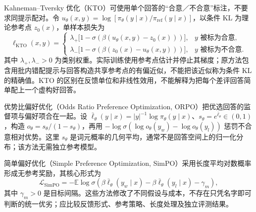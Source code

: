 Kahneman--Tversky 优化（KTO）可使用单个回答的“合意／不合意”标注，不要求同提示配对。令 $u_\theta(x,y)=\log[\pi_\theta(y\mid x)/\pi_{\mathrm{ref}}(y\mid x)]$，以条件 KL 为理论参考点 $z_0(x)$，单样本损失为
\[
\ell_{\mathrm{KTO}}(x,y)=
\begin{cases}
\lambda_+\bigl[1-\sigma(\beta(u_\theta(x,y)-z_0(x)))\bigr],&y\text{ 被标为合意},\\
\lambda_-\bigl[1-\sigma(\beta(z_0(x)-u_\theta(x,y)))\bigr],&y\text{ 被标为不合意}.
\end{cases}
\]
其中 $\lambda_+,\lambda_->0$ 为类别权重。实际训练使用参考点估计并停止其梯度；原方法包含用批内错配提示与回答构造共享参考点的有偏近似，不能把该近似称为条件 KL 的精确值。KTO 的区别在反馈单位和非线性效用，不能解释为把每个差评回答简单配上一个虚构好回答\cite{kto}。

优势比偏好优化（Odds Ratio Preference Optimization, ORPO）把优选回答的监督项与偏好项合在一起。设 $\bar\ell_\theta(y\mid x)=|y|^{-1}\log\pi_\theta(y\mid x)$、$s_\theta=e^{\bar\ell_\theta}\in(0,1)$，构造 $o_\theta=s_\theta/(1-s_\theta)$，再用 $-\log\sigma(\log o_\theta(y_w)-\log o_\theta(y_l))$ 惩罚不合意相对优势。这里 $s_\theta$ 是词元概率的几何平均，通常不是回答空间上的归一化分布；该方法无需独立参考模型\cite{orpo}。

简单偏好优化（Simple Preference Optimization, SimPO）采用长度平均对数概率形成无参考奖励，其核心形式为
\[
\mathcal L_{\mathrm{SimPO}}=-\mathbb E\log\sigma\!\left(
\beta\bar\ell_\theta(y_w\mid x)-\beta\bar\ell_\theta(y_l\mid x)-\gamma_m\right),
\]
其中 $\gamma_m>0$ 是目标间隔\cite{simpo}。这些方法修改了不同假设与成本，不存在只凭名字即可判断的统一优劣；应比较反馈形式、参考策略、长度处理及独立评测结果。

